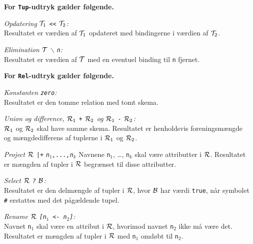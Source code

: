 \documentclass{article}
\newcounter{eks}
\begin{document}


{\bf For \verb"Tup"-udtryk g\ae{}lder f\o{}lgende.}

{\em Opdatering ${\cal T}_1$ \verb"<<" ${\cal T}_2$:}\\
Resultatet er v\ae{}rdien af ${\cal T}_1$ opdateret med
bindingerne i v\ae{}rdien af ${\cal T}_2$.

{\em Elimination $\cal T$ $\backslash$ \verb"n":}\\
Resultatet er v\ae{}rdien af $\cal T$ med en eventuel binding
til \verb"n" fjernet.

{\bf For \verb"Rel"-udtryk g\ae{}lder f\o{}lgende.}

{\em Konstanten \verb"zero":}\\
Resultatet er den tomme relation med tomt skema.

{\em Union og difference, ${\cal R}_1$ \verb"+" ${\cal R}_2$ og
${\cal R}_1$ \verb"-" ${\cal R}_2$:}\\
${\cal R}_1$ og ${\cal R}_2$ skal have samme skema. Resultatet er
henholdsvis foreningsm\ae{}ngde og m\ae{}ngdedifferens af tuplerne
i ${\cal R}_1$ og ${\cal R}_2$.

{\em Project $\cal R$ \verb"|+" \verb"n"$_1$\verb",...,n"$_k$}
Navnene \verb"n"$_1$, \ldots, \verb"n"$_k$ skal v\ae{}re attributter
i $\cal R$. Resultatet er m\ae{}ngden af tupler i $\cal R$ begr\ae{}nset
til disse attributter.

{\em Select $\cal R$ \verb"?" $\cal B$:}\\
Resultatet er den delm\ae{}ngde af tupler i $\cal R$, hvor
$\cal B$ har v\ae{}rdi \verb"true", n\aa{}r symbolet \verb"#" erstattes
med det p\aa{}g\ae{}ldende tupel.

{\em Rename $\cal R$ \verb"[n"$_1$\verb" <- n"$_2$\verb"]":}\\
Navnet \verb"n"$_1$ skal v\ae{}re en attribut i $\cal R$, hvorimod
navnet \verb"n"$_2$ ikke m\aa{} v\ae{}re det. Resultatet er
m\ae{}ngden af tupler i $\cal R$ med \verb"n"$_1$ omd\o{}bt
til \verb"n"$_2$.
\end{document}
